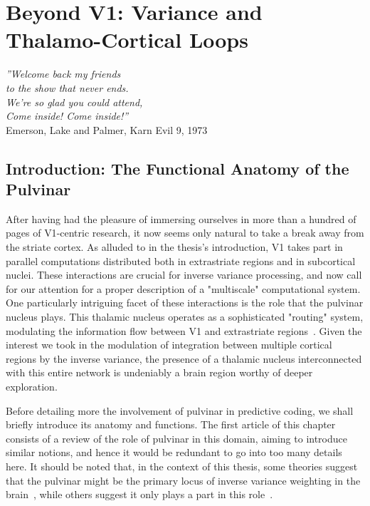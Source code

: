 \chapter{Beyond V1: Variance and Thalamo-Cortical Loops}

\begin{flushright}
    \textit{''Welcome back my friends \\
    to the show that never ends. \\
    We’re so glad you could attend, \\
    Come inside! Come inside!''}\\
    Emerson, Lake and Palmer, Karn Evil 9, 1973
\end{flushright}

\chaptertoc{}

\section{Introduction: The Functional Anatomy of the Pulvinar}
After having had the pleasure of immersing ourselves in more than a hundred of pages of \gls{V1}-centric research, it now seems only natural to take a break away from the striate cortex. As alluded to in the thesis's introduction, \gls{V1} takes part in parallel computations distributed both in extrastriate regions and in subcortical nuclei. These interactions are crucial for inverse variance processing, and now call for our attention for a proper description of a "multiscale" computational system. One particularly intriguing facet of these interactions is the role that the pulvinar nucleus plays. This thalamic nucleus operates as a sophisticated "routing" system, modulating the information flow between \gls{V1} and extrastriate regions~\cite{casanova2004functions}. Given the interest we took in the modulation of integration between multiple cortical regions by the inverse variance, the presence of a thalamic nucleus interconnected with this entire network is undeniably a brain region worthy of deeper exploration. 

Before detailing more the involvement of pulvinar in predictive coding, we shall briefly introduce its anatomy and functions. The first article of this chapter consists of a review of the role of pulvinar in this domain, aiming to introduce similar notions, and hence it would be redundant to go into too many details here. It should be noted that, in the context of this thesis, some theories suggest that the pulvinar might be the primary locus of inverse variance weighting in the brain~\cite{kanai2015cerebral}, while others suggest it only plays a part in this role~\cite{millidge2021predictive}.

